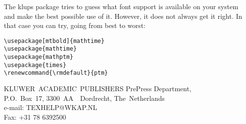 \documentclass[a4paper,namedreferences]{kluwer}
\renewcommand{\rmdefault}{ptm}
\begin{document}
\begin{article}
The klups package tries to guess what font support is available on
your system and make the best possible use of it. However, it
does not always get it right. In that case you can try, going from
best to worst:
\begin{verbatim}
\usepackage[mtbold]{mathtime}
\usepackage{mathtime}
\usepackage{mathptm}
\usepackage{times}
\renewcommand{\rmdefault}{ptm}
\end{verbatim}
\par\bigskip\bigskip     
KLUWER~ACADEMIC~PUBLISHERS PrePress Department,\\
P.O.~Box~17, 3300~AA~~Dordrecht, The~Netherlands\\
e-mail: TEXHELP@WKAP.NL\\ 
Fax: +31 78 6392500

                                                      
\end{article}                            
\end{document}
